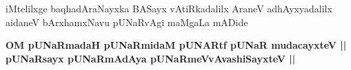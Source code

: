 \begin{center}
iMtelilxge baqhadAraNayxka BASayx vAtiRkadalilx AraneV adhAyxyadalilx 
aidaneV bArxhamxNavu pUNaRvAgi maMgaLa mADide
\end{center}

\begin{center}
\textbf{OM pUNaRmadaH pUNaRmidaM pUNARtf pUNaR mudacayxteV ||\\
pUNaRsayx pUNaRmAdAya pUNaRmeVvAvashiSayxteV ||} 
\end{center}

\centerline{}
